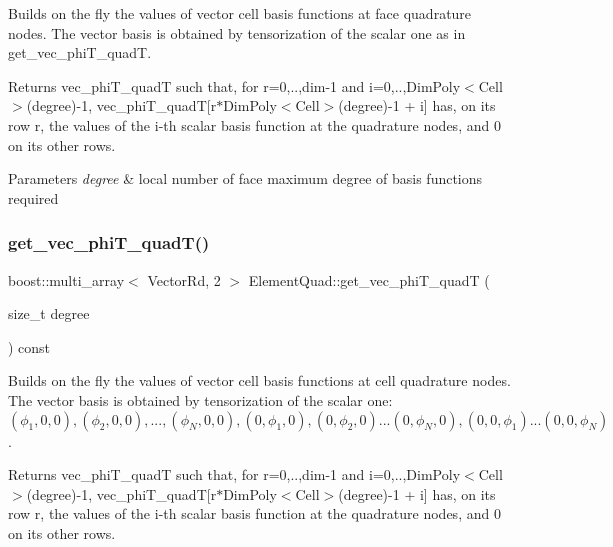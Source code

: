 Builds on the fly the values of vector cell basis functions at face quadrature nodes. The vector basis is obtained by tensorization of the scalar one as in get\+\_\+vec\+\_\+phi\+T\+\_\+quadT. 

\begin{DoxyReturn}{Returns}
vec\+\_\+phi\+T\+\_\+quadT such that, for r=0,..,dim-\/1 and i=0,..,Dim\+Poly$<$\+Cell$>$(degree)-\/1, vec\+\_\+phi\+T\+\_\+quadT\mbox{[}r$\ast$\+Dim\+Poly$<$\+Cell$>$(degree)-\/1 + i\mbox{]} has, on its row r, the values of the i-\/th scalar basis function at the quadrature nodes, and 0 on its other rows. 
\end{DoxyReturn}

\begin{DoxyParams}{Parameters}
{\em degree} & local number of face maximum degree of basis functions required \\
\hline
\end{DoxyParams}
\mbox{\label{classHArDCore3D_1_1ElementQuad_a3c549d43c0a5171d0c14f6b56ffc843d}} 
\subsubsection{\texorpdfstring{get\+\_\+vec\+\_\+phi\+T\+\_\+quad\+T()}{get\_vec\_phiT\_quadT()}}
{\footnotesize\ttfamily boost\+::multi\+\_\+array$<$ Vector\+Rd, 2 $>$ Element\+Quad\+::get\+\_\+vec\+\_\+phi\+T\+\_\+quadT (\begin{DoxyParamCaption}\item[{size\+\_\+t}]{degree }\end{DoxyParamCaption}) const}



Builds on the fly the values of vector cell basis functions at cell quadrature nodes. The vector basis is obtained by tensorization of the scalar one\+: $(\phi_1,0,0), (\phi_2,0,0), ..., (\phi_N,0,0), (0,\phi_1,0), (0,\phi_2,0) ... (0,\phi_N,0), (0,0,\phi_1) ... (0,0,\phi_N)$. 

\begin{DoxyReturn}{Returns}
vec\+\_\+phi\+T\+\_\+quadT such that, for r=0,..,dim-\/1 and i=0,..,Dim\+Poly$<$\+Cell$>$(degree)-\/1, vec\+\_\+phi\+T\+\_\+quadT\mbox{[}r$\ast$\+Dim\+Poly$<$\+Cell$>$(degree)-\/1 + i\mbox{]} has, on its row r, the values of the i-\/th scalar basis function at the quadrature nodes, and 0 on its other rows. 
\end{DoxyReturn}

